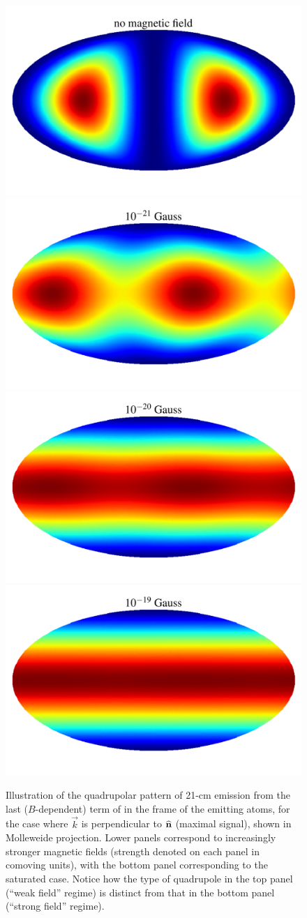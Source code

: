 \begin{figure}
\centering
\includegraphics[width=.35\textwidth,keepaspectratio=true]{hp_B_0e+00G.pdf}
\includegraphics[width=.35\textwidth,keepaspectratio=true]{hp_B_1e-18G.pdf}
\includegraphics[width=.35\textwidth,keepaspectratio=true]{hp_B_1e-17G.pdf}
\includegraphics[width=.35\textwidth,keepaspectratio=true]{hp_B_1e-16G.pdf}
\caption{Illustration of the quadrupolar pattern of 21-cm emission from the last ($B$-dependent) term of \eq{\ref{eq:tbsoln}} in the frame of the emitting atoms, for the case where $\vec k$ is perpendicular to ${\bf{\widehat n}}$ (maximal signal), shown in Molleweide projection. Lower panels correspond to increasingly stronger magnetic fields (strength denoted on each panel in comoving units), with the bottom panel corresponding to the saturated case. Notice how the type of quadrupole in the top panel (``weak field'' regime) is distinct from that in the bottom panel  (``strong field'' regime). \label{fig:hp}}
\end{figure}

